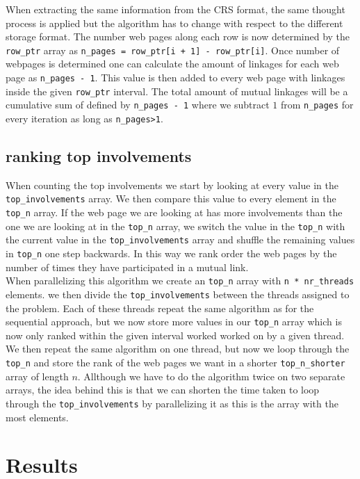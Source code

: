 \documentclass[onecolumn]{aastex62}
\begin{document}
When extracting the same information from the CRS format, the same thought process is applied but the algorithm has to change with respect to the different storage format. The number web pages along each row is now determined by the \texttt{row\_ptr} array as \texttt{n\_pages = row\_ptr[i + 1] - row\_ptr[i]}. Once number of webpages is determined one can calculate the amount of linkages for each web page as \texttt{n\_pages - 1}. This value is then added to every web page with linkages inside the given \texttt{row\_ptr} interval. The total amount of mutual linkages will be a cumulative sum of defined by \texttt{n\_pages - 1} where we subtract $1$ from \texttt{n\_pages} for every iteration as long as \texttt{n\_pages>1}.
\subsection{ranking top involvements}
When counting the top involvements we start by looking at every value in the \texttt{top\_involvements} array. We then compare this value to every element in the \texttt{top\_n} array. If the web page we are looking at has more involvements than the one we are looking at in the \texttt{top\_n} array, we switch the value in the \texttt{top\_n} with the current value in the \texttt{top\_involvements} array and shuffle the remaining values in \texttt{top\_n} one step backwards. In this way we rank order the web pages by the number of times they have participated in a mutual link.\\

When parallelizing this algorithm we create an \texttt{top\_n} array with \texttt{n * nr\_threads} elements. we then divide the \texttt{top\_involvements} between the threads assigned to the problem. Each of these threads repeat the same algorithm as for the sequential approach, but we now store more values in our \texttt{top\_n} array which is now only ranked within the given interval worked worked on by a given thread. We then repeat the same algorithm on one thread, but now we loop through the \texttt{top\_n} and store the rank of the web pages we want in a shorter \texttt{top\_n\_shorter} array of length $n$. Allthough we have to do the algorithm twice on two separate arrays, the idea behind this is that we can shorten the time taken to loop through the \texttt{top\_involvements} by parallelizing it as this is the array with the most elements.
\section{Results}\label{sec:results}



\end{document}
